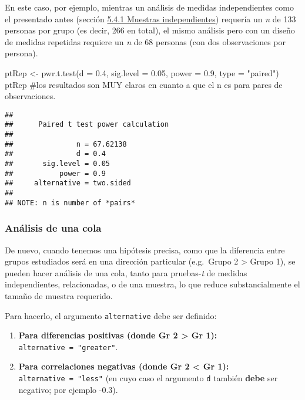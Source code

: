 \documentclass[
]{article}
\newenvironment{Shaded}{\begin{snugshade}}{\end{snugshade}}
\newcommand{\AttributeTok}[1]{\textcolor[rgb]{0.16,0.50,0.73}{#1}}
\newcommand{\CommentTok}[1]{\textcolor[rgb]{0.48,0.49,0.49}{#1}}
\newcommand{\FloatTok}[1]{\textcolor[rgb]{0.96,0.45,0.00}{#1}}
\newcommand{\FunctionTok}[1]{\textcolor[rgb]{0.56,0.27,0.68}{#1}}
\newcommand{\NormalTok}[1]{\textcolor[rgb]{0.81,0.81,0.76}{#1}}
\newcommand{\OtherTok}[1]{\textcolor[rgb]{0.15,0.68,0.38}{#1}}
\newcommand{\StringTok}[1]{\textcolor[rgb]{0.96,0.31,0.31}{#1}}
\providecommand{\tightlist}{%
  \setlength{\itemsep}{0pt}\setlength{\parskip}{0pt}}
\begin{document}
En este caso, por ejemplo, mientras un análisis de medidas
independientes como el presentado antes (sección
\protect\hyperlink{TInd}{5.4.1 Muestras independientes}) requería un
\emph{n} de 133 personas por grupo (es decir, 266 en total), el mismo
análisis pero con un diseño de medidas repetidas requiere un \emph{n} de
68 personas (con dos observaciones por persona).

\begin{Shaded}
\begin{Highlighting}[]
\NormalTok{ptRep }\OtherTok{\textless{}{-}} \FunctionTok{pwr.t.test}\NormalTok{(}\AttributeTok{d =} \FloatTok{0.4}\NormalTok{,}
                    \AttributeTok{sig.level =} \FloatTok{0.05}\NormalTok{,}
                    \AttributeTok{power =} \FloatTok{0.9}\NormalTok{,}
                    \AttributeTok{type =} \StringTok{"paired"}\NormalTok{)}
\NormalTok{ptRep }\CommentTok{\#los resultados son MUY claros en cuanto a que el n es para pares de observaciones.}
\end{Highlighting}
\end{Shaded}

\begin{verbatim}
## 
##      Paired t test power calculation 
## 
##               n = 67.62138
##               d = 0.4
##       sig.level = 0.05
##           power = 0.9
##     alternative = two.sided
## 
## NOTE: n is number of *pairs*
\end{verbatim}

\hypertarget{anuxe1lisis-de-una-cola}{%
\subsubsection{Análisis de una cola}\label{anuxe1lisis-de-una-cola}}

De nuevo, cuando tenemos una hipótesis precisa, como que la diferencia
entre grupos estudiados será en una dirección particular (e.g.~Grupo 2
\textgreater{} Grupo 1), se pueden hacer análisis de una cola, tanto
para pruebas-\emph{t} de medidas independientes, relacionadas, o de una
muestra, lo que reduce substancialmente el tamaño de muestra requerido.

Para hacerlo, el argumento \texttt{alternative} debe ser definido:

\begin{enumerate}
\def\labelenumi{\arabic{enumi}.}
\tightlist
\item
  \textbf{Para diferencias positivas (donde Gr 2 \textgreater{} Gr 1):}
  \texttt{alternative\ =\ "greater"}.
\item
  \textbf{Para correlaciones negativas (donde Gr 2 \textless{} Gr 1):}
  \texttt{alternative\ =\ "less"} (en cuyo caso el argumento \texttt{d}
  también \textbf{debe} ser negativo; por ejemplo -0.3).
\end{enumerate}
\end{document}
